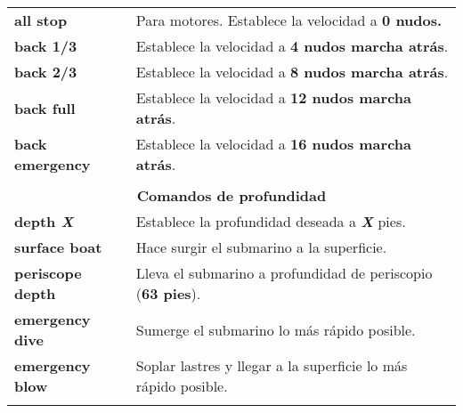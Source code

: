 \begin{table}[h]
\begin{tabular}{@{}ll@{}}
		\textbf{all stop}        & Para motores. Establece la velocidad a \textbf{0 nudos.}                                                                                                      \\
		\textbf{back 1/3}        & Establece la velocidad a \textbf{4 nudos marcha atrás}.                                                                                         \\
		\textbf{back 2/3}        & Establece la velocidad a \textbf{8 nudos marcha atrás}.                                                                                         \\
		\textbf{back full}       & Establece la velocidad a \textbf{12 nudos marcha atrás}.                                                                                        \\
		\textbf{back emergency}  & Establece la velocidad a \textbf{16 nudos marcha atrás}.                                                                                        \\
		&                                                                                                                                        \\ \midrule
		\multicolumn{2}{c}{\textbf{Comandos de profundidad}}                                                                                                              \\ \midrule
		\textbf{depth \textit{X}}         & Establece la profundidad deseada a \textbf{\textit{X}} pies.                                                                                             \\
		\textbf{surface boat}    & Hace surgir el submarino a la superficie.                                                                                              \\
		\textbf{periscope depth} & Lleva el submarino a profundidad de periscopio (\textbf{63 pies}).                                                                              \\
		\textbf{emergency dive}  & Sumerge el submarino lo más rápido posible.                                                                                           \\
		\textbf{emergency blow}  & Soplar lastres y llegar a la superficie lo más rápido posible.                                                                \\
		&                                                                                                                                        \\ \midrule

\end{tabular}
\end{table}
